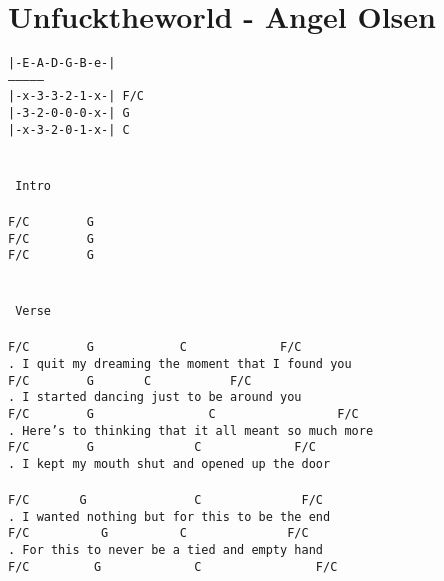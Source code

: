 \newpage
\section{Unfucktheworld - Angel Olsen}
\label{Unfucktheworld - Angel Olsen}
\texttt{|-E-A-D-G-B-e-|\\
---------------\\
|-x-3-3-2-1-x-|\  F/C\\ 
|-3-2-0-0-0-x-|\ G\\
|-x-3-2-0-1-x-|\ C\\
\\
\\
\lbrack\ Intro\rbrack\\
\\
F/C\ \ \ \ \ \ \ \ G\ \ \ \\
F/C\ \ \ \ \ \ \ \ G\ \ \ \\
F/C\ \ \ \ \ \ \ \ G\ \ \\
\\
\\
\lbrack\ Verse\rbrack\\
\\
F/C\ \ \ \ \ \ \ \ G\ \ \ \ \ \ \ \ \ \ \ \ C\ \ \ \ \ \ \ \ \ \ \ \ \ F/C\\
. I\ quit\ my\ dreaming\ the\ moment\ that\ I\ found\ you\\
F/C\ \ \ \ \ \ \ \ G\ \ \ \ \ \ \ C\ \ \ \ \ \ \ \ \ \ \ F/C\\
. I\ started\ dancing\ just\ to\ be\ around\ you\\
F/C\ \ \ \ \ \ \ \ G\ \ \ \ \ \ \ \ \ \ \ \ \ \ \ \ C\ \ \ \ \ \ \ \ \ \ \ \ \ \ \ \ \ F/C\\
. Here's\ to\ thinking\ that\ it\ all\ meant\ so\ much\ more\\
F/C\ \ \ \ \ \ \ \ G\ \ \ \ \ \ \ \ \ \ \ \ \ \ C\ \ \ \ \ \ \ \ \ \ \ \ \ F/C\\
. I\ kept\ my\ mouth\ shut\ and\ opened\ up\ the\ door\\
\\
F/C\ \ \ \ \ \ \ G\ \ \ \ \ \ \ \ \ \ \ \ \ \ \ C\ \ \ \ \ \ \ \ \ \ \ \ \ \ F/C\\
. I\ wanted\ nothing\ but\ for\ this\ to\ be\ the\ end\\
F/C\ \ \ \ \ \ \ \ \ \ G\ \ \ \ \ \ \ \ \ \ C\ \ \ \ \ \ \ \ \ \ \ \ \ \ F/C\\
. For\ this\ to\ never\ be\ a\ tied\ and\ empty\ hand\\
F/C\ \ \ \ \ \ \ \ \ G\ \ \ \ \ \ \ \ \ \ \ \ \ C\ \ \ \ \ \ \ \ \ \ \ \ \ \ \ \ F/C\\
}
